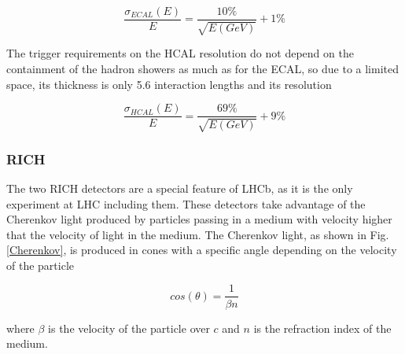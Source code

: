  \begin{equation}
 \frac{\sigma_{ECAL}(E)}{E} = \frac{10\%}{\sqrt{E(GeV)}} + 1\%
 \end{equation}

The trigger requirements on the HCAL resolution do not depend on the containment of the hadron showers as much 
as for the ECAL, so due to a limited space, its thickness is only 5.6 interaction lengths and its resolution

 \begin{equation}
 \frac{\sigma_{HCAL}(E)}{E} = \frac{69\%}{\sqrt{E(GeV)}} + 9\%
 \end{equation}




\subsubsection{RICH}

The two RICH detectors are a special feature of LHCb, as it is the only experiment at LHC including them. 
These detectors take advantage of the  Cherenkov light produced by particles passing in a medium with velocity 
higher that the velocity of light in the medium. The Cherenkov light, as shown in Fig. \ref{Cherenkov}, 
is produced in cones with a specific angle depending on the velocity of the particle

\begin{equation}
cos(\theta) = \frac{1}{\beta n}
\end{equation}

where $\beta$ is the velocity of the particle over $c$ and $n$ is the refraction index of the medium.

